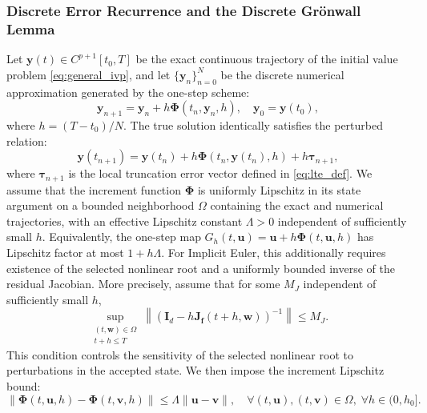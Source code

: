 \documentclass[11pt,a4paper]{article}
\theoremstyle{definition}
\theoremstyle{remark}
\begin{document}
\subsubsection{Discrete Error Recurrence and the Discrete Gr\"onwall Lemma}
Let $\mathbf{y}(t) \in C^{p+1}[t_0, T]$ be the exact continuous trajectory of the initial value problem \eqref{eq:general_ivp}, and let $\{\mathbf{y}_n\}_{n=0}^N$ be the discrete numerical approximation generated by the one-step scheme:
\begin{equation}
\label{eq:increment_form_convergence}
\mathbf{y}_{n+1} = \mathbf{y}_n + h \mathbf{\Phi}(t_n, \mathbf{y}_n, h), \quad \mathbf{y}_0 = \mathbf{y}(t_0),
\end{equation}
where $h = (T - t_0)/N$. The true solution identically satisfies the perturbed relation:
\begin{equation}
\label{eq:exact_perturbed_relation}
\mathbf{y}(t_{n+1}) = \mathbf{y}(t_n) + h \mathbf{\Phi}(t_n, \mathbf{y}(t_n), h) + h \boldsymbol{\tau}_{n+1},
\end{equation}
where $\boldsymbol{\tau}_{n+1}$ is the local truncation error vector defined in \eqref{eq:lte_def}. We assume that the increment function $\mathbf{\Phi}$ is uniformly Lipschitz in its state argument on a bounded neighborhood $\Omega$ containing the exact and numerical trajectories, with an effective Lipschitz constant $\Lambda>0$ independent of sufficiently small $h$. Equivalently, the one-step map $G_h(t,\mathbf{u})=\mathbf{u}+h\mathbf{\Phi}(t,\mathbf{u},h)$ has Lipschitz factor at most $1+h\Lambda$. For Implicit Euler, this additionally requires existence of the selected nonlinear root and a uniformly bounded inverse of the residual Jacobian. More precisely, assume that for some $M_J$ independent of sufficiently small $h$,
\begin{equation}
\label{eq:uniform_residual_inverse}
\sup_{\substack{(t,\mathbf{w})\in\Omega\\ t+h\le T}}
\left\|
\left(\mathbf{I}_d-h\mathbf{J}_{\mathbf f}(t+h,\mathbf{w})\right)^{-1}
\right\|\le M_J.
\end{equation}
This condition controls the sensitivity of the selected nonlinear root to perturbations in the accepted state. We then impose the increment Lipschitz bound:
\begin{equation}
\label{eq:increment_lipschitz}
\|\mathbf{\Phi}(t, \mathbf{u}, h) - \mathbf{\Phi}(t, \mathbf{v}, h)\| \le \Lambda \|\mathbf{u} - \mathbf{v}\|, \quad \forall (t, \mathbf{u}), (t, \mathbf{v}) \in \Omega, \; \forall h \in (0, h_0].
\end{equation}
\end{document}
